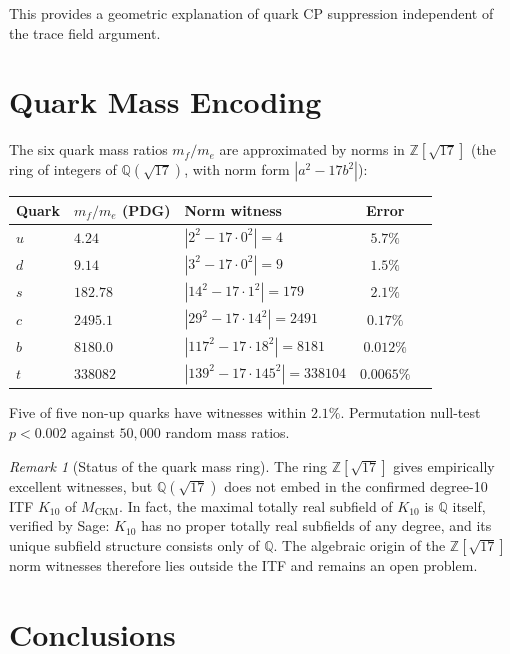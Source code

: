 \documentclass[11pt,a4paper]{article}
\theoremstyle{remark}
\newtheorem{remark}[theorem]{Remark}
\newcommand{\MCKM}{M_{\mathrm{CKM}}}
\newcommand{\QQ}{\mathbb{Q}}
\newcommand{\ZZ}{\mathbb{Z}}
\begin{document}
This provides a geometric explanation of quark CP suppression
independent of the trace field argument.

\section{Quark Mass Encoding}
\label{sec:mass}

The six quark mass ratios $m_f/m_e$ are approximated by norms in
$\ZZ[\sqrt{17}]$ (the ring of integers of $\QQ(\sqrt{17})$,
with norm form $|a^2-17b^2|$):

\begin{center}
\begin{tabular}{lllcc}
\toprule
Quark & $m_f/m_e$ (PDG) & Norm witness & Error \\
\midrule
$u$ & $4.24$   & $|2^2 - 17\cdot0^2|=4$          & $5.7\%$ \\
$d$ & $9.14$   & $|3^2 - 17\cdot0^2|=9$          & $1.5\%$ \\
$s$ & $182.78$ & $|14^2-17\cdot1^2|=179$          & $2.1\%$ \\
$c$ & $2495.1$ & $|29^2-17\cdot14^2|=2491$        & $0.17\%$ \\
$b$ & $8180.0$ & $|117^2-17\cdot18^2|=8181$       & $0.012\%$ \\
$t$ & $338082$ & $|139^2-17\cdot145^2|=338104$    & $0.0065\%$ \\
\bottomrule
\end{tabular}
\end{center}

Five of five non-up quarks have witnesses within $2.1\%$.
Permutation null-test $p < 0.002$ against $50{,}000$ random mass ratios.

\begin{remark}[Status of the quark mass ring]
The ring $\ZZ[\sqrt{17}]$ gives empirically excellent witnesses,
but $\QQ(\sqrt{17})$ does not embed in the confirmed degree-10 ITF
$K_{10}$ of $\MCKM$. In fact, the maximal totally real subfield of
$K_{10}$ is $\QQ$ itself, verified by Sage: $K_{10}$ has no proper
totally real subfields of any degree, and its unique subfield
structure consists only of $\QQ$. The algebraic origin of the
$\ZZ[\sqrt{17}]$ norm witnesses therefore lies outside the ITF
and remains an open problem.
\end{remark}

\section{Conclusions}
\label{sec:concl}
\end{document}
